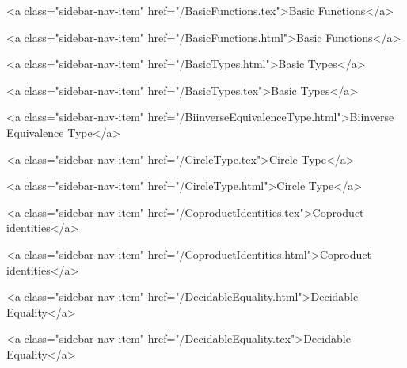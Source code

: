       
        
          <a class="sidebar-nav-item" href="/BasicFunctions.tex">Basic Functions</a>
        
      
    
      
        
          <a class="sidebar-nav-item" href="/BasicFunctions.html">Basic Functions</a>
        
      
    
      
        
          <a class="sidebar-nav-item" href="/BasicTypes.html">Basic Types</a>
        
      
    
      
        
          <a class="sidebar-nav-item" href="/BasicTypes.tex">Basic Types</a>
        
      
    
      
        
          <a class="sidebar-nav-item" href="/BiinverseEquivalenceType.html">Biinverse Equivalence Type</a>
        
      
    
      
        
          <a class="sidebar-nav-item" href="/CircleType.tex">Circle Type</a>
        
      
    
      
        
          <a class="sidebar-nav-item" href="/CircleType.html">Circle Type</a>
        
      
    
      
        
          <a class="sidebar-nav-item" href="/CoproductIdentities.tex">Coproduct identities</a>
        
      
    
      
        
          <a class="sidebar-nav-item" href="/CoproductIdentities.html">Coproduct identities</a>
        
      
    
      
        
          <a class="sidebar-nav-item" href="/DecidableEquality.html">Decidable Equality</a>
        
      
    
      
        
          <a class="sidebar-nav-item" href="/DecidableEquality.tex">Decidable Equality</a>
        
